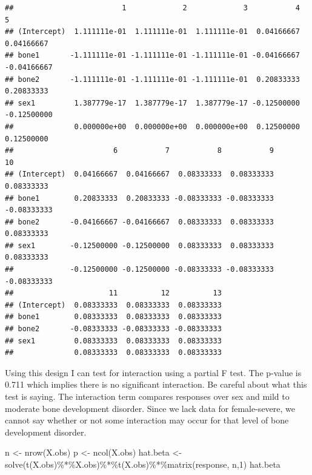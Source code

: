 \documentclass[
]{book}
\newenvironment{Shaded}{\begin{snugshade}}{\end{snugshade}}
\newcommand{\DecValTok}[1]{\textcolor[rgb]{0.00,0.00,0.81}{#1}}
\newcommand{\FunctionTok}[1]{\textcolor[rgb]{0.00,0.00,0.00}{#1}}
\newcommand{\NormalTok}[1]{#1}
\newcommand{\OtherTok}[1]{\textcolor[rgb]{0.56,0.35,0.01}{#1}}
\newcommand{\SpecialCharTok}[1]{\textcolor[rgb]{0.00,0.00,0.00}{#1}}
\begin{document}
\begin{verbatim}
##                         1             2             3           4           5
## (Intercept)  1.111111e-01  1.111111e-01  1.111111e-01  0.04166667  0.04166667
## bone1       -1.111111e-01 -1.111111e-01 -1.111111e-01 -0.04166667 -0.04166667
## bone2       -1.111111e-01 -1.111111e-01 -1.111111e-01  0.20833333  0.20833333
## sex1         1.387779e-17  1.387779e-17  1.387779e-17 -0.12500000 -0.12500000
##              0.000000e+00  0.000000e+00  0.000000e+00  0.12500000  0.12500000
##                       6           7           8           9          10
## (Intercept)  0.04166667  0.04166667  0.08333333  0.08333333  0.08333333
## bone1        0.20833333  0.20833333 -0.08333333 -0.08333333 -0.08333333
## bone2       -0.04166667 -0.04166667  0.08333333  0.08333333  0.08333333
## sex1        -0.12500000 -0.12500000  0.08333333  0.08333333  0.08333333
##             -0.12500000 -0.12500000 -0.08333333 -0.08333333 -0.08333333
##                      11          12          13
## (Intercept)  0.08333333  0.08333333  0.08333333
## bone1        0.08333333  0.08333333  0.08333333
## bone2       -0.08333333 -0.08333333 -0.08333333
## sex1         0.08333333  0.08333333  0.08333333
##              0.08333333  0.08333333  0.08333333
\end{verbatim}

Using this design I can test for interaction using a partial F test. The p-value is 0.711 which implies there is no significant interaction. Be careful about what this test is saying. The interaction term compares responses over sex and mild to moderate bone development disorder. Since we lack data for female-severe, we cannot say whether or not some interaction may occur for that level of bone development disorder.

\begin{Shaded}
\begin{Highlighting}[]
\NormalTok{n }\OtherTok{\textless{}{-}} \FunctionTok{nrow}\NormalTok{(X.obs)}
\NormalTok{p }\OtherTok{\textless{}{-}} \FunctionTok{ncol}\NormalTok{(X.obs)}
\NormalTok{hat.beta }\OtherTok{\textless{}{-}} \FunctionTok{solve}\NormalTok{(}\FunctionTok{t}\NormalTok{(X.obs)}\SpecialCharTok{\%*\%}\NormalTok{X.obs)}\SpecialCharTok{\%*\%}\FunctionTok{t}\NormalTok{(X.obs)}\SpecialCharTok{\%*\%}\FunctionTok{matrix}\NormalTok{(response, n,}\DecValTok{1}\NormalTok{)}
\NormalTok{hat.beta}
\end{Highlighting}
\end{Shaded}
\end{document}
